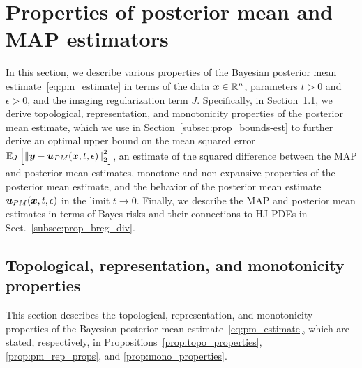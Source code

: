 \section{Properties of posterior mean and MAP estimators} \label{sec:properties_estimators}

In this section, we describe various properties of the Bayesian posterior mean estimate~\eqref{eq:pm_estimate} in terms of the data $\boldsymbol{x} \in \mathbb{R}^n$, parameters $t>0$ and $\epsilon>0$, and the imaging regularization term $J$. Specifically, in Section~\ref{subsec:prop_topo-rep-mono}, we derive topological, representation, and monotonicity properties of the posterior mean estimate, which we use in Section~\ref{subsec:prop_bounds-est} to further derive an optimal upper bound on the mean squared error $\mathbb{E}_{J}\left [{\left\Vert{\boldsymbol{y}-\boldsymbol{u}_{PM}(\boldsymbol{x},t,\epsilon)} \right\Vert_{2}^{2}}\right]$, an estimate of the squared difference between the MAP and posterior mean estimates, monotone and non-expansive properties of the posterior mean estimate, and the behavior of the posterior mean estimate $\boldsymbol{u}_{PM}(\boldsymbol{x},t,\epsilon)$ in the limit $t \to 0$. Finally, we describe the MAP and posterior mean estimates in terms of Bayes risks and their connections to HJ PDEs in Sect.~\ref{subsec:prop_breg_div}.


\subsection{Topological, representation, and monotonicity properties} \label{subsec:prop_topo-rep-mono}
This section describes the topological, representation, and monotonicity properties of the Bayesian posterior mean estimate~\eqref{eq:pm_estimate}, which are stated, respectively, in Propositions~\ref{prop:topo_properties}, \ref{prop:pm_rep_props}, and \ref{prop:mono_properties}.

